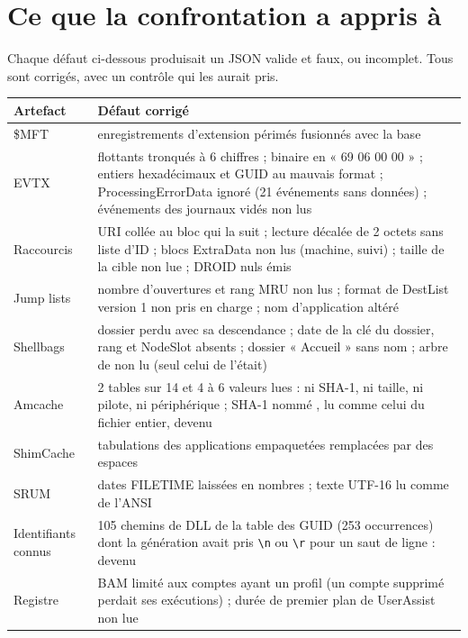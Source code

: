 \documentclass[11pt,a4paper,oneside]{report}
\begin{document}
\chapter{Ce que la confrontation a appris à \wac{}}\label{chap:defauts}

Chaque défaut ci-dessous produisait un JSON valide et faux, ou incomplet. Tous
sont corrigés, avec un contrôle qui les aurait pris.

\begin{longtable}{@{}L{3.0cm}L{12.0cm}@{}}
\toprule
\textbf{Artefact} & \textbf{Défaut corrigé} \\
\midrule\endhead
\$MFT & enregistrements d'extension périmés fusionnés avec la base \\
EVTX & flottants tronqués à 6 chiffres ; binaire en « 69 06 00 00 » ; entiers hexadécimaux et GUID au mauvais format ; ProcessingErrorData ignoré (21 événements sans données) ; événements des journaux vidés non lus \\
Raccourcis & URI collée au bloc qui la suit ; lecture décalée de 2 octets sans liste d'ID ; blocs ExtraData non lus (machine, suivi) ; taille de la cible non lue ; DROID nuls émis \\
Jump lists & nombre d'ouvertures et rang MRU non lus ; format de DestList version 1 non pris en charge ; nom d'application altéré \\
Shellbags & dossier perdu avec sa descendance ; date de la clé du dossier, rang et NodeSlot absents ; dossier « Accueil » sans nom ; arbre de  non lu (seul celui de  l'était) \\
Amcache & 2 tables sur 14 et 4 à 6 valeurs lues : ni SHA-1, ni taille, ni pilote, ni périphérique ; SHA-1 nommé , lu comme celui du fichier entier, devenu  \\
ShimCache & tabulations des applications empaquetées remplacées par des espaces \\
SRUM & dates FILETIME laissées en nombres ; texte UTF-16 lu comme de l'ANSI \\
Identifiants connus & 105 chemins de DLL de la table des GUID (253 occurrences) dont la génération avait pris \texttt{\textbackslash n} ou \texttt{\textbackslash r} pour un saut de ligne :  devenu  \\
Registre & BAM limité aux comptes ayant un profil (un compte supprimé perdait ses exécutions) ; durée de premier plan de UserAssist non lue \\

\end{longtable}
\end{document}
